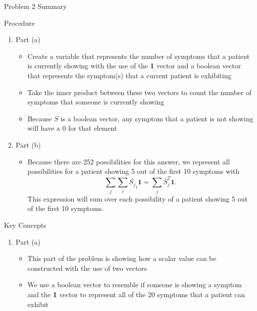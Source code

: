 \begin{summary}{Problem 2 Summary}
    \begin{statement}{Procedure}
        \begin{enumerate}[label = (\alph*)]
            \item Part (a)
            \begin{itemize}
                \item Create a variable that represents the number of symptoms that a patient is currently showing with the use of the \textbf{1} vector and a boolean vector that represents the symptom(s)
                that a current patient is exhibiting
                \item Take the inner product between these two vectors to count the number of symptoms that someone is currently showing
                \item Because $S$ is a boolean vector, any symptom that a patient is not showing will have a 0 for that element
            \end{itemize}
            \item Part (b)
            \begin{itemize}
                \item Because there are 252 possibilities for this answer, we represent all possibilities for a patient showing 5 out of the first 10 symptoms with 
                \begin{equation*}
                    \sum_{j}\sum_{i} \bar{S_{j}}_{i}\mathbf{1} = \sum_{j} \bar{S}^{T}_{j}\mathbf{1}.
                \end{equation*}
                This expression will sum over each possibility of a patient showing 5 out of the first 10 symptoms.
            \end{itemize}
        \end{enumerate}
    \end{statement}
    \begin{statement}{Key Concepts}
        \begin{enumerate}[label = (\alph*)]
            \item Part (a)
            \begin{itemize}
                \item This part of the problem is showing how a scalar value can be constructed with the use of two vectors
                \item We use a boolean vector to resemble if someone is showing a symptom and the \textbf{1} vector to represent all of the 20 symptoms that a patient can exhibit

\end{itemize}
\end{enumerate}
\end{statement}
\end{summary}
